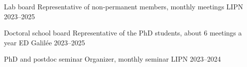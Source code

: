 


\begin{cvpubs}
\end{cvpubs}

\begin{cvhonors}
  \cvhonor
    {Lab board} %
    {Representative of non-permanent members, monthly meetings} %
    {LIPN} %
    {2023--2025} %

  \cvhonor
    {Doctoral school board} %
    {Representative of the PhD students, about 6 meetings a year} %
    {ED Galilée} %
    {2023--2025} %

   \cvhonor
    {PhD and postdoc seminar} %
    {Organizer, monthly seminar} %
    {LIPN} %
    {2023--2024} %

\end{cvhonors}
\vspace{3.6pt} %


